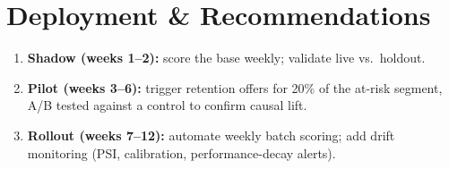 \section{Deployment \& Recommendations}
\begin{enumerate}[leftmargin=1.4em,itemsep=3pt]
  \item \textbf{Shadow (weeks 1--2):} score the base weekly; validate live vs.\ holdout.
  \item \textbf{Pilot (weeks 3--6):} trigger retention offers for 20\% of the at-risk segment,
        A/B tested against a control to confirm causal lift.
  \item \textbf{Rollout (weeks 7--12):} automate weekly batch scoring; add drift monitoring
        (PSI, calibration, performance-decay alerts).
\end{enumerate}
